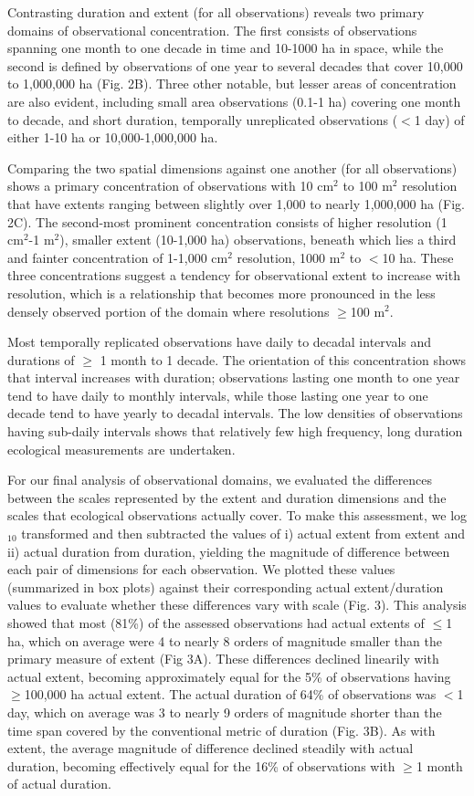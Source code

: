 \documentclass[12pt]{article}
\begin{document}
Contrasting duration and extent (for all observations) reveals two primary domains of observational concentration. The first consists of observations spanning one month to one decade in time and 10-1000 ha in space, while the second is defined by observations of one year to several decades that cover 10,000 to 1,000,000 ha (Fig. 2B).  Three other notable, but lesser areas of concentration are also evident, including small area observations (0.1-1 ha) covering one month to decade, and short duration, temporally unreplicated observations ($<$1 day) of either 1-10 ha or 10,000-1,000,000 ha. 

Comparing the two spatial dimensions against one another (for all observations) shows a primary concentration of observations with 10 cm$^2$ to 100 m$^2$ resolution that have extents ranging between slightly over 1,000 to nearly 1,000,000 ha (Fig. 2C). The second-most prominent concentration consists of higher resolution (1 cm$^2$-1 m$^2$), smaller extent (10-1,000 ha) observations, beneath which lies a third and fainter concentration of 1-1,000 cm$^2$ resolution, 1000 m$^2$ to $<$10 ha. These three concentrations suggest a tendency for observational extent to increase with resolution, which is a relationship that becomes more pronounced in the less densely observed portion of the domain where resolutions $\geq$100 m$^2$.  

Most temporally replicated observations have daily to decadal intervals and durations of $\geq$ 1 month to 1 decade. The orientation of this concentration shows that interval increases with duration; observations lasting one month to one year tend to have daily to monthly intervals, while those lasting one year to one decade tend to have yearly to decadal intervals. The low densities of observations having sub-daily intervals shows that relatively few high frequency, long duration ecological measurements are undertaken.  

For our final analysis of observational domains, we evaluated the differences between the scales represented by the extent and duration dimensions and the scales that ecological observations actually cover. To make this assessment, we log$_{10}$ transformed and then subtracted the values of i) actual extent from extent and ii) actual duration from duration, yielding the magnitude of difference between each pair of dimensions for each observation. We plotted these values (summarized in box plots) against their corresponding actual extent/duration values to evaluate whether these differences vary with scale (Fig. 3). This analysis showed that most (81\%) of the assessed observations had actual extents of $\leq$1 ha, which on average were 4 to nearly 8 orders of magnitude smaller than the primary measure of extent (Fig 3A). These differences declined linearily with actual extent, becoming approximately equal for the 5\% of observations having $\geq$100,000 ha actual extent. The actual duration of 64\% of observations was $<$1 day, which on average was 3 to nearly 9 orders of magnitude shorter than the time span covered by the conventional metric of duration (Fig. 3B). As with extent, the average magnitude of difference declined steadily with actual duration, becoming effectively equal for the 16\% of observations with $\geq$1 month of actual duration. 
\end{document}
